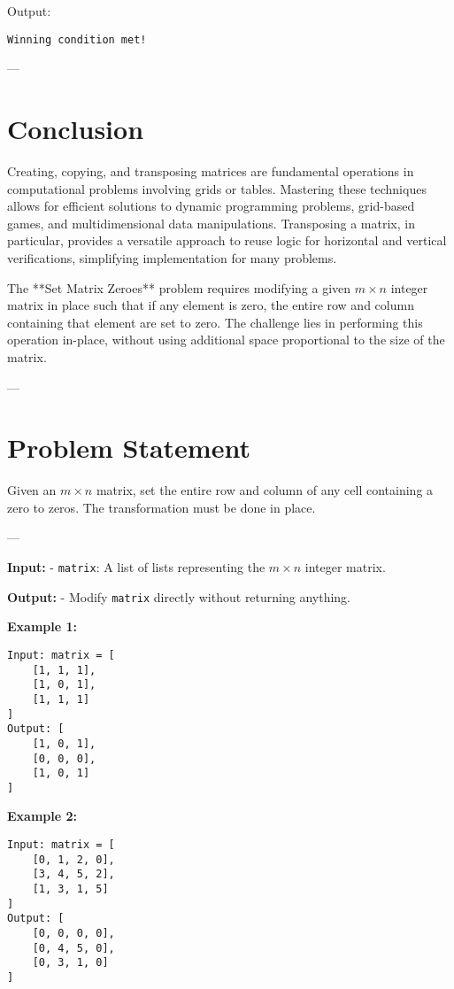 Output:
\begin{verbatim}
Winning condition met!
\end{verbatim}

---

\section*{Conclusion}
Creating, copying, and transposing matrices are fundamental operations in computational problems involving grids or tables. Mastering these techniques allows for efficient solutions to dynamic programming problems, grid-based games, and multidimensional data manipulations. Transposing a matrix, in particular, provides a versatile approach to reuse logic for horizontal and vertical verifications, simplifying implementation for many problems.


\label{problem:Set_Matrix_Zeroes}

The **Set Matrix Zeroes** problem requires modifying a given \(m \times n\) integer matrix in place such that if any element is zero, the entire row and column containing that element are set to zero. The challenge lies in performing this operation in-place, without using additional space proportional to the size of the matrix.

---

\section*{Problem Statement}
Given an \(m \times n\) matrix, set the entire row and column of any cell containing a zero to zeros. The transformation must be done in place.

---

\textbf{Input:}
- \texttt{matrix}: A list of lists representing the \(m \times n\) integer matrix.

\textbf{Output:}
- Modify \texttt{matrix} directly without returning anything.

\textbf{Example 1:}
\begin{verbatim}
Input: matrix = [
    [1, 1, 1],
    [1, 0, 1],
    [1, 1, 1]
]
Output: [
    [1, 0, 1],
    [0, 0, 0],
    [1, 0, 1]
]
\end{verbatim}

\textbf{Example 2:}
\begin{verbatim}
Input: matrix = [
    [0, 1, 2, 0],
    [3, 4, 5, 2],
    [1, 3, 1, 5]
]
Output: [
    [0, 0, 0, 0],
    [0, 4, 5, 0],
    [0, 3, 1, 0]
]
\end{verbatim}


